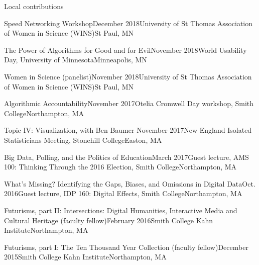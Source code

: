 \documentclass{resume} %
\begin{document}
\begin{rSection}{Local contributions}
\begin{sSubsection}{Speed Networking Workshop}{}{December 2018}{University of St Thomas Association of Women in Science (WINS)}{St Paul, MN}
\end{sSubsection}

\begin{sSubsection}{The Power of Algorithms for Good and for Evil}{}{November 2018}{World Usability Day, University of Minnesota}{Minneapolis, MN}
\end{sSubsection}

\begin{sSubsection}{Women in Science}{ (panelist)}{November 2018}{University of St Thomas Association of Women in Science (WINS)}{St Paul, MN}
\end{sSubsection}

\begin{sSubsection}{Algorithmic Accountability}{}{November 2017}{Otelia Cromwell Day workshop, Smith College}{Northampton, MA}
\end{sSubsection}

\begin{sSubsection}{Topic IV: Visualization}{, with Ben Baumer }{November 2017}{New England Isolated Statisticians Meeting, Stonehill College}{Easton, MA}
\end{sSubsection}

\begin{sSubsection}{Big Data, Polling, and the Politics of Education}{}{March 2017}{Guest lecture, AMS 100: Thinking Through the 2016 Election, Smith College}{Northampton, MA}
\end{sSubsection}

\begin{sSubsection}{What's Missing? Identifying the Gaps, Biases, and Omissions in Digital Data}{}{Oct. 2016}{Guest lecture, IDP 160: Digital Effects, Smith College}{Northampton, MA}
\end{sSubsection}

\begin{sSubsection}{Futurisms, part II: Intersections: Digital Humanities, Interactive Media and Cultural Heritage}{ (faculty fellow)}{February 2016}{Smith College Kahn Institute}{Northampton, MA}
\end{sSubsection}
\begin{sSubsection}{Futurisms, part I: The Ten Thousand Year Collection}{ (faculty fellow)}{December 2015}{Smith College Kahn Institute}{Northampton, MA}
\end{sSubsection}


\end{rSection}
\end{document}
